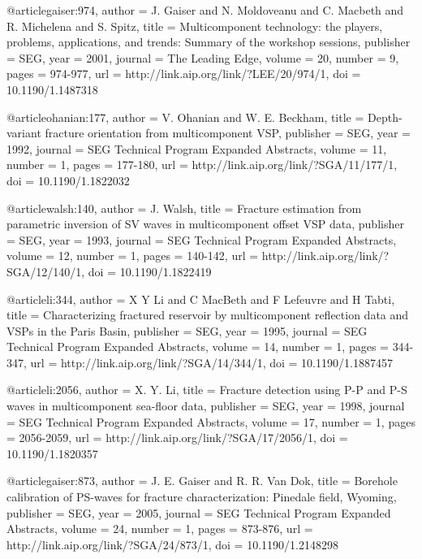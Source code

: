 @article{gaiser:974,
  author =	 {J. Gaiser and N. Moldoveanu and C. Macbeth
                  and R. Michelena and S. Spitz},
  title =	 {Multicomponent technology: the players, problems,
                  applications, and trends: Summary of the workshop
                  sessions},
  publisher =	 {SEG},
  year =	 2001,
  journal =	 {The Leading Edge},
  volume =	 20,
  number =	 9,
  pages =	 {974-977},
  url =		 {http://link.aip.org/link/?LEE/20/974/1},
  doi =		 {10.1190/1.1487318}
}

@article{ohanian:177,
  author =	 {V. Ohanian and W. E. Beckham},
  title =	 {Depth-variant fracture orientation from
                  multicomponent VSP},
  publisher =	 {SEG},
  year =	 1992,
  journal =	 {SEG Technical Program Expanded Abstracts},
  volume =	 11,
  number =	 1,
  pages =	 {177-180},
  url =		 {http://link.aip.org/link/?SGA/11/177/1},
  doi =		 {10.1190/1.1822032}
}

@article{walsh:140,
  author =	 {J. Walsh},
  title =	 {Fracture estimation from parametric inversion of
                  {SV} waves in multicomponent offset VSP data},
  publisher =	 {SEG},
  year =	 1993,
  journal =	 {SEG Technical Program Expanded Abstracts},
  volume =	 12,
  number =	 1,
  pages =	 {140-142},
  url =		 {http://link.aip.org/link/?SGA/12/140/1},
  doi =		 {10.1190/1.1822419}
}

@article{li:344,
  author =	 {X Y Li and C MacBeth and F
                  Lefeuvre and H Tabti},
  title =	 {Characterizing fractured reservoir by multicomponent
                  reflection data and {VSP}s in the Paris Basin},
  publisher =	 {SEG},
  year =	 1995,
  journal =	 {SEG Technical Program Expanded Abstracts},
  volume =	 14,
  number =	 1,
  pages =	 {344-347},
  url =		 {http://link.aip.org/link/?SGA/14/344/1},
  doi =		 {10.1190/1.1887457}
}

@article{li:2056,
  author =	 {X. Y. Li},
  title =	 {Fracture detection using {P}-{P} and {P}-{S} waves
                  in multicomponent sea-floor data},
  publisher =	 {SEG},
  year =	 1998,
  journal =	 {SEG Technical Program Expanded Abstracts},
  volume =	 17,
  number =	 1,
  pages =	 {2056-2059},
  url =		 {http://link.aip.org/link/?SGA/17/2056/1},
  doi =		 {10.1190/1.1820357}
}

@article{gaiser:873,
  author =	 {J. E. Gaiser and R. R. Van Dok},
  title =	 {Borehole calibration of PS-waves for fracture
                  characterization: Pinedale field, Wyoming},
  publisher =	 {SEG},
  year =	 2005,
  journal =	 {SEG Technical Program Expanded Abstracts},
  volume =	 24,
  number =	 1,
  pages =	 {873-876},
  url =		 {http://link.aip.org/link/?SGA/24/873/1},
  doi =		 {10.1190/1.2148298}
}

